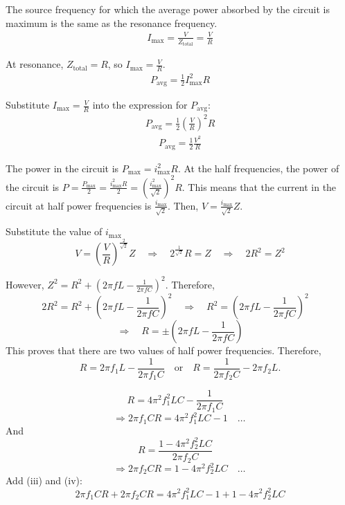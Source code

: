 \documentclass[journal,12pt,twocolumn]{IEEEtran}
\theoremstyle{remark}
\begin{document}
The source frequency for which the average power absorbed by the circuit is maximum is the same as the resonance frequency. 
\begin{align}
    I_{\text{max}} = \frac{V}{Z_{\text{total}}} = \frac{V}{R}
\end{align}

At resonance, \(Z_{\text{total}} = R\), so \(I_{\text{max}} = \frac{V}{R}\).
\begin{align}
    P_{\text{avg}} = \frac{1}{2} I_{\text{max}}^2 R
\end{align}

Substitute \(I_{\text{max}} = \frac{V}{R}\) into the expression for \(P_{\text{avg}}\):
\begin{align}
    P_{\text{avg}} = \frac{1}{2} \left(\frac{V}{R}\right)^2 R
\end{align}
\begin{align}
    P_{\text{avg}} = \frac{1}{2} \frac{V^2}{R}
    \label{eq:9}
\end{align}



The power in the circuit is $P_{\text{max}} = i_{\text{max}}^2 R$. At the half frequencies, the power of the circuit is $P = \frac{P_{\text{max}}}{2} = \frac{i_{\text{max}}^2 R}{2} = \left(\frac{i_{\text{max}}^2}{\sqrt{2}}\right)^2 R$. This means that the current in the circuit at half power frequencies is $\frac{i_{\text{max}}}{\sqrt{2}}$. Then, $V = \frac{i_{\text{max}}}{\sqrt{2}} Z$.

Substitute the value of $i_{\text{max}}$ 
\[
V = \left(\frac{V}{R}\right)^{\frac{2}{\sqrt{2}}} Z \quad \Rightarrow \quad 2^{\frac{1}{\sqrt{2}}} R = Z \quad \Rightarrow \quad 2R^2 = Z^2
\]

However, $Z^2 = R^2 + \left(2\pi f L - \frac{1}{2\pi f C}\right)^2$. Therefore,
\[
2R^2 = R^2 + \left(2\pi f L - \frac{1}{2\pi f C}\right)^2 \quad \Rightarrow \quad R^2 = \left(2\pi f L - \frac{1}{2\pi f C}\right)^2 \quad 
\]
\[
\Rightarrow \quad R = \pm \left(2\pi f L - \frac{1}{2\pi f C}\right)\]
This proves that there are two values of half power frequencies. Therefore,
\[
R = 2\pi f_1 L - \frac{1}{2\pi f_1 C} \quad \text{or} \quad R = \frac{1}{2\pi f_2 C} - 2\pi f_2 L.
\]

\[
R = 4\pi^2 f_1^2 LC - \frac{1}{2\pi f_1 C} \quad 
\]
\[
\Rightarrow 2\pi f_1 C R = 4\pi^2 f_1^2 LC - 1 \quad \ldots \, \]
And
\[
R = \frac{1 - 4\pi^2 f_2^2 LC}{2\pi f_2 C} \quad 
\]
\[
\Rightarrow 2\pi f_2 C R = 1 - 4\pi^2 f_2^2 LC \quad \ldots \, \]
Add (iii) and (iv):
\[
2\pi f_1 C R + 2\pi f_2 C R = 4\pi^2 f_1^2 LC - 1 + 1 - 4\pi^2 f_2^2 LC
\]
\end{document}
